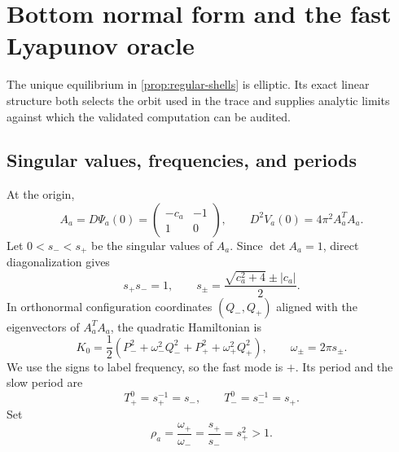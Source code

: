 \section{Bottom normal form and the fast Lyapunov oracle}
\label{sec:normal-form}

The unique equilibrium in \cref{prop:regular-shells} is elliptic.  Its exact
linear structure both selects the orbit used in the trace and supplies
analytic limits against which the validated computation can be audited.

\subsection{Singular values, frequencies, and periods}

At the origin,
\begin{equation}
 A_a=D\Psi_a(0)=
 \begin{pmatrix}-c_a&-1\\1&0\end{pmatrix},
 \qquad
 D^2V_a(0)=4\pi^2A_a^TA_a.
 \label{eq:bottom-hessian}
\end{equation}
Let \(0<s_-<s_+\) be the singular values of \(A_a\).  Since
\(\det A_a=1\), direct diagonalization gives
\begin{equation}
 s_+s_-=1,
 \qquad
 s_\pm=\frac{\sqrt{c_a^2+4}\pm|c_a|}{2}.
 \label{eq:singular-values}
\end{equation}
In orthonormal configuration coordinates \((Q_-,Q_+)\) aligned with the
eigenvectors of \(A_a^TA_a\), the quadratic Hamiltonian is
\begin{equation}
 K_0=\frac12\left(P_-^2+\omega_-^2Q_-^2
                      +P_+^2+\omega_+^2Q_+^2\right),
 \qquad \omega_\pm=2\pi s_\pm.
 \label{eq:harmonic-normal-form}
\end{equation}
We use the signs to label frequency, so the fast mode is \(+\).  Its period
and the slow period are
\begin{equation}
 T_+^0=s_+^{-1}=s_-,
 \qquad
 T_-^0=s_-^{-1}=s_+.
 \label{eq:linear-periods}
\end{equation}
Set
\begin{equation}
 \rho_a=\frac{\omega_+}{\omega_-}=\frac{s_+}{s_-}=s_+^2>1.
 \label{eq:frequency-ratio}
\end{equation}

